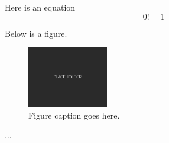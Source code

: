 \documentclass[11pt]{article}
\begin{document}
\frontmatter



Here is an equation
%
\begin{equation}
0! = 1
\end{equation}




Below is a figure.

\begin{figure}[H]
\hypertarget{fig1}{}
\centering
\includegraphics[width=100pt]{Figures/Placeholder.png}
\caption{Figure caption goes here.}
\end{figure}




...
\end{document}
